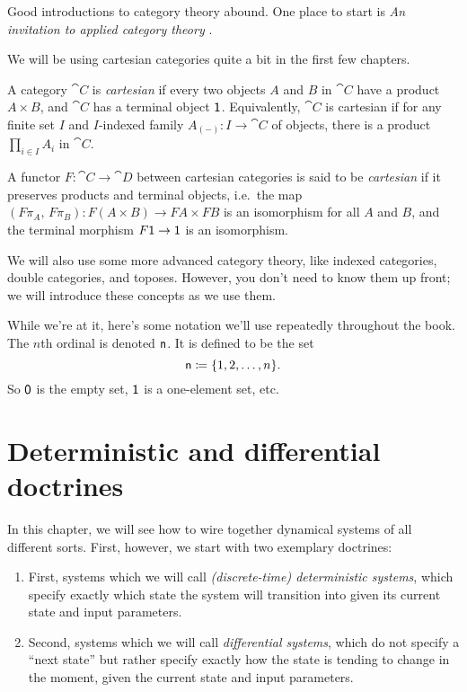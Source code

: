 \documentclass[DynamicalBook]{subfiles}
\begin{document}
Good introductions to category theory abound. One place to start is \emph{An invitation to applied category theory} \cite{fong2019seven}.

We will be using cartesian categories quite a bit in the first few chapters.
\begin{definition}\label{def.cartesian_category}
  A category $\cat{C}$ is \emph{cartesian} if every two objects $A$ and $B$ in
  $\cat{C}$ have a product $A \times B$, and $\cat{C}$ has a terminal object
  $\mathsf{1}$. Equivalently, $\cat{C}$ is cartesian if for any finite set $I$ and
  $I$-indexed family $A_{(-)} : I \to \cat{C}$ of objects, there is a product
  $\prod_{i \in I} A_i$ in $\cat{C}$.

  A functor $F : \cat{C} \to \cat{D}$ between cartesian categories is said to be
  \emph{cartesian} if it preserves products and terminal objects, i.e.\ the
  map $(F\pi_A,\, F\pi_B) : F(A \times B) \to FA \times FB$ is an isomorphism
  for all $A$ and $B$, and the terminal morphism $F\mathsf{1} \to \mathsf{1}$ is an
  isomorphism. 
\end{definition}

We will also use some more advanced category theory, like indexed
categories, double categories, and toposes. However, you don't need to know them up front; we will introduce these concepts
as we use them.

While we're at it, here's some notation we'll use repeatedly throughout the book. The $n$th ordinal is denoted $\mathsf{n}$. It is defined to be the set
\[
\mathsf{n}\coloneqq\{1,2,\ldots,n\}.
\]
So $\mathsf{0}$ is the empty set, $\mathsf{1}$ is a one-element set, etc.

\section{Deterministic and differential doctrines}

In this chapter, we will see how to wire together dynamical systems of all
different sorts. First, however, we start with two exemplary doctrines:

\begin{enumerate}
\item First, systems which we will call \emph{(discrete-time) deterministic
    systems}, which specify exactly which state the system will transition into
  given its current state and input parameters.
\item Second, systems which we will call \emph{differential systems}, which do
  not specify a ``next state'' but rather specify exactly how the state is
  tending to change in the moment, given the current state and input parameters.
\end{enumerate}
\end{document}
